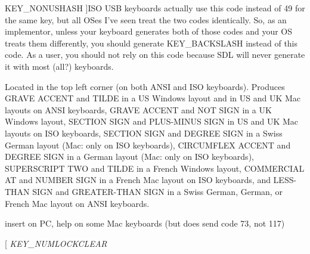 \begin{Desc}
\begin{description}
{\hypertarget{classphys_1_1MetaCode_a3e501cbb5bf0f6f1fdb7211465bda8d8afd23349e045ee52f42e1c5c25ee3cec3}{
KEY\_\-NONUSHASH}
\label{da/dc9/classphys_1_1MetaCode_a3e501cbb5bf0f6f1fdb7211465bda8d8afd23349e045ee52f42e1c5c25ee3cec3}
}]ISO USB keyboards actually use this code instead of 49 for the same key, but all OSes I've seen treat the two codes identically. So, as an implementor, unless your keyboard generates both of those codes and your OS treats them differently, you should generate KEY\_\-BACKSLASH instead of this code. As a user, you should not rely on this code because SDL will never generate it with most (all?) keyboards. \item[{\em 
\hypertarget{classphys_1_1MetaCode_a3e501cbb5bf0f6f1fdb7211465bda8d8a1961eccca163bf3ceb9e6dea3c23375c}{
KEY\_\-GRAVE}
\label{da/dc9/classphys_1_1MetaCode_a3e501cbb5bf0f6f1fdb7211465bda8d8a1961eccca163bf3ceb9e6dea3c23375c}
}]Located in the top left corner (on both ANSI and ISO keyboards). Produces GRAVE ACCENT and TILDE in a US Windows layout and in US and UK Mac layouts on ANSI keyboards, GRAVE ACCENT and NOT SIGN in a UK Windows layout, SECTION SIGN and PLUS-\/MINUS SIGN in US and UK Mac layouts on ISO keyboards, SECTION SIGN and DEGREE SIGN in a Swiss German layout (Mac: only on ISO keyboards), CIRCUMFLEX ACCENT and DEGREE SIGN in a German layout (Mac: only on ISO keyboards), SUPERSCRIPT TWO and TILDE in a French Windows layout, COMMERCIAL AT and NUMBER SIGN in a French Mac layout on ISO keyboards, and LESS-\/THAN SIGN and GREATER-\/THAN SIGN in a Swiss German, German, or French Mac layout on ANSI keyboards. \item[{\em 
\hypertarget{classphys_1_1MetaCode_a3e501cbb5bf0f6f1fdb7211465bda8d8a708ea6204b1cc2ed7756989b8d850ce6}{
KEY\_\-INSERT}
\label{da/dc9/classphys_1_1MetaCode_a3e501cbb5bf0f6f1fdb7211465bda8d8a708ea6204b1cc2ed7756989b8d850ce6}
}]insert on PC, help on some Mac keyboards (but does send code 73, not 117) \item[{\em 
\hypertarget{classphys_1_1MetaCode_a3e501cbb5bf0f6f1fdb7211465bda8d8a7cd4a721f5b2be2cc13856a46199508a}{
KEY\_\-NUMLOCKCLEAR}
\label{da/dc9/classphys_1_1MetaCode_a3e501cbb5bf0f6f1fdb7211465bda8d8a7cd4a721f5b2be2cc13856a46199508a}
}
\end{description}
\end{Desc}
